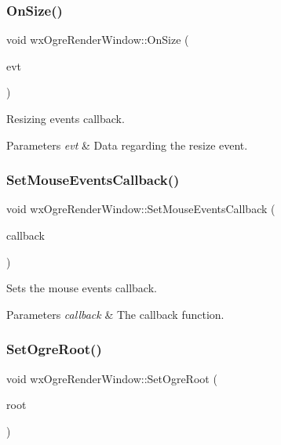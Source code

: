 \subsubsection{\texorpdfstring{On\+Size()}{OnSize()}}
{\footnotesize\ttfamily void wx\+Ogre\+Render\+Window\+::\+On\+Size (\begin{DoxyParamCaption}\item[{wx\+Size\+Event \&}]{evt }\end{DoxyParamCaption})\hspace{0.3cm}{\ttfamily [virtual]}}

Resizing events callback. 
\begin{DoxyParams}{Parameters}
{\em evt} & Data regarding the resize event. \\
\hline
\end{DoxyParams}
\mbox{\label{classwx_ogre_render_window_ad2d0c71f8757ddd48623f8e475100f76}} 
\subsubsection{\texorpdfstring{Set\+Mouse\+Events\+Callback()}{SetMouseEventsCallback()}}
{\footnotesize\ttfamily void wx\+Ogre\+Render\+Window\+::\+Set\+Mouse\+Events\+Callback (\begin{DoxyParamCaption}\item[{Mouse\+Events\+Callback}]{callback }\end{DoxyParamCaption})}

Sets the mouse events callback. 
\begin{DoxyParams}{Parameters}
{\em callback} & The callback function. \\
\hline
\end{DoxyParams}
\mbox{\label{classwx_ogre_render_window_adbd1dc0de7ed468785eeb0cae1239210}} 
\subsubsection{\texorpdfstring{Set\+Ogre\+Root()}{SetOgreRoot()}}
{\footnotesize\ttfamily void wx\+Ogre\+Render\+Window\+::\+Set\+Ogre\+Root (\begin{DoxyParamCaption}\item[{Ogre\+::\+Root $\ast$}]{root }\end{DoxyParamCaption})\hspace{0.3cm}{\ttfamily [static]}}

